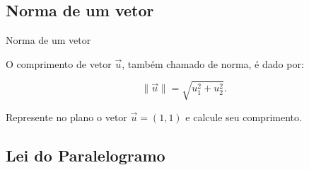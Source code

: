 \subsection*{Norma de um vetor}
\begin{frame}[label=vetores]{Norma de um vetor}

O {\color{blue}comprimento} de vetor $\vec{u}$, também chamado de {\color{blue}norma}, é dado por:

\begin{center}
\begin{minipage}{0.5\textwidth}
\begin{block}{}
\[\|\vec{u}\|=\sqrt{u_1^2+u_2^2}.\]
\end{block}
\end{minipage}
\end{center}


\begin{exe}
Represente no plano o vetor $\vec{u}=(1,1)$ e calcule seu comprimento.
\end{exe}
\end{frame}

\subsection*{Lei do Paralelogramo}

